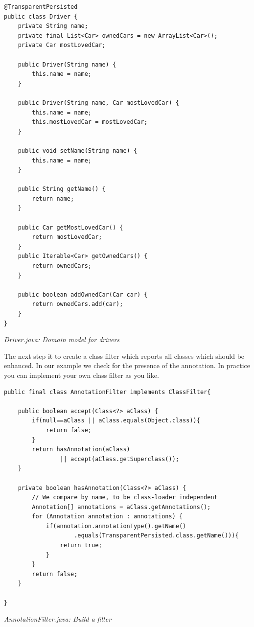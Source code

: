\begin{lstlisting}
@TransparentPersisted
public class Driver {
    private String name;
    private final List<Car> ownedCars = new ArrayList<Car>();
    private Car mostLovedCar;

    public Driver(String name) {
        this.name = name;
    }

    public Driver(String name, Car mostLovedCar) {
        this.name = name;
        this.mostLovedCar = mostLovedCar;
    }

    public void setName(String name) {
        this.name = name;
    }

    public String getName() {
        return name;
    }

    public Car getMostLovedCar() {
        return mostLovedCar;
    }
    public Iterable<Car> getOwnedCars() {
        return ownedCars;
    }

    public boolean addOwnedCar(Car car) {
        return ownedCars.add(car);
    }
}
\end{lstlisting}

{\small\itshape Driver.java: Domain model for drivers\par}
\medskip

The next step it to create a class filter which reports all classes which should be enhanced. In our example we check for the presence of the annotation. In practice you can implement your own class filter as you like.

\begin{lstlisting}
public final class AnnotationFilter implements ClassFilter{

    public boolean accept(Class<?> aClass) {
        if(null==aClass || aClass.equals(Object.class)){
            return false;
        }
        return hasAnnotation(aClass)
                || accept(aClass.getSuperclass());
    }

    private boolean hasAnnotation(Class<?> aClass) {
        // We compare by name, to be class-loader independent
        Annotation[] annotations = aClass.getAnnotations();
        for (Annotation annotation : annotations) {
            if(annotation.annotationType().getName()
                    .equals(TransparentPersisted.class.getName())){
                return true;
            }
        }
        return false;
    }

}
\end{lstlisting}

{\small\itshape AnnotationFilter.java: Build a filter\par}
\medskip


